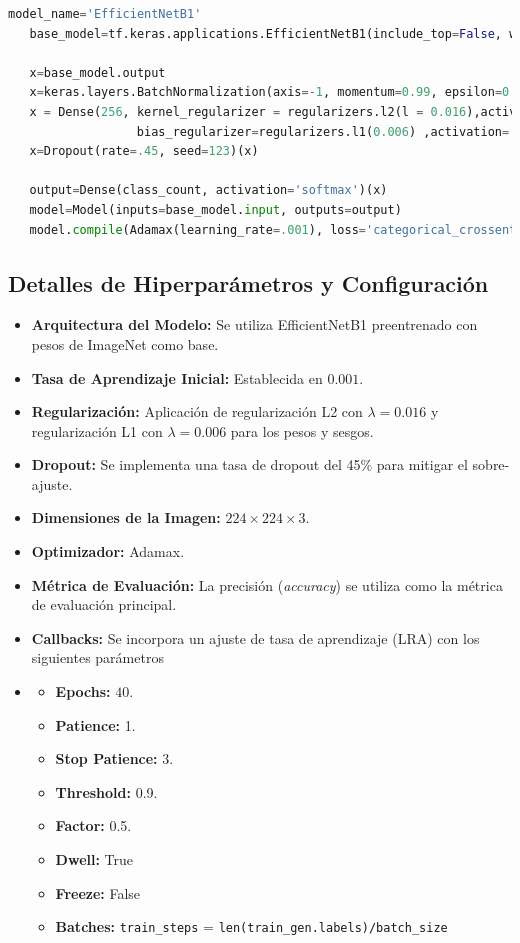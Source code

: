 \begin{lstlisting}[language=Python]
   model_name='EfficientNetB1'
   base_model=tf.keras.applications.EfficientNetB1(include_top=False, weights="imagenet",input_shape=img_shape, pooling='max')

   x=base_model.output
   x=keras.layers.BatchNormalization(axis=-1, momentum=0.99, epsilon=0.001 )(x)
   x = Dense(256, kernel_regularizer = regularizers.l2(l = 0.016),activity_regularizer=regularizers.l1(0.006),
                  bias_regularizer=regularizers.l1(0.006) ,activation='relu')(x)
   x=Dropout(rate=.45, seed=123)(x)

   output=Dense(class_count, activation='softmax')(x)
   model=Model(inputs=base_model.input, outputs=output)
   model.compile(Adamax(learning_rate=.001), loss='categorical_crossentropy', metrics=['accuracy'])
\end{lstlisting}

\subsection*{Detalles de Hiperparámetros y Configuración}

\begin{itemize}
   \item \textbf{Arquitectura del Modelo:} Se utiliza EfficientNetB1 preentrenado con pesos de ImageNet como base.
   \item \textbf{Tasa de Aprendizaje Inicial:} Establecida en $0.001$.
   \item \textbf{Regularización:} Aplicación de regularización L2 con $\lambda = 0.016$ y regularización L1 con $\lambda = 0.006$ para los pesos y sesgos.
   \item \textbf{Dropout:} Se implementa una tasa de dropout del 45\% para mitigar el sobre-ajuste.
   \item \textbf{Dimensiones de la Imagen:} $224 \times 224 \times 3$.
   \item \textbf{Optimizador:} Adamax.
   \item \textbf{Métrica de Evaluación:} La precisión (\textit{accuracy}) se utiliza como la métrica de evaluación principal.
   \item \textbf{Callbacks:} Se incorpora un ajuste de tasa de aprendizaje (LRA) con los siguientes parámetros
   \item \begin{itemize}
      \item \textbf{Epochs:} $40$.
      \item \textbf{Patience:} 1.      
      \item \textbf{Stop Patience:} 3.
      \item \textbf{Threshold:}  0.9.
      \item \textbf{Factor:} 0.5.      
      \item \textbf{Dwell:} True
      \item \textbf{Freeze:} False  
      \item \textbf{Batches:} \texttt{train\_steps} = \texttt{len(train\_gen.labels)/batch\_size}
   \end{itemize}
\end{itemize}

